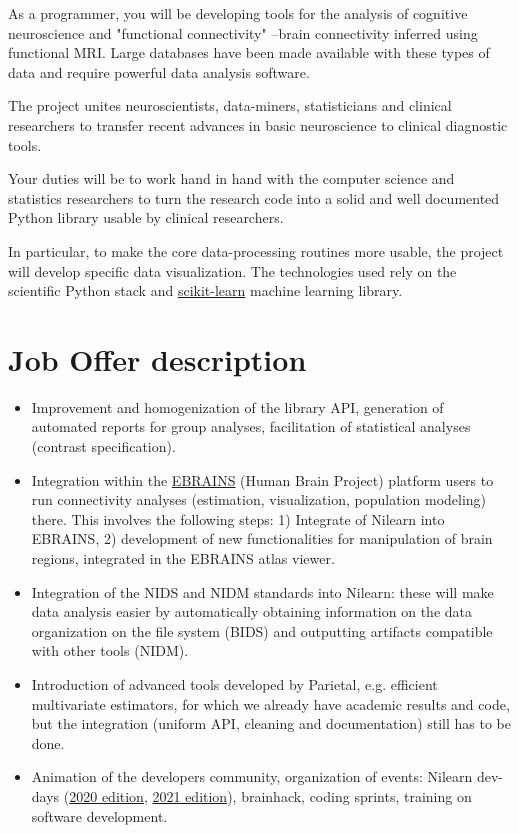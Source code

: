 \documentclass{article}
\begin{document}
As a programmer, you will be developing tools for the analysis of cognitive neuroscience and "functional connectivity" --brain connectivity inferred using functional MRI. Large databases have been made available with these types of data and require powerful data analysis software.

The project unites neuroscientists, data-miners, statisticians and clinical researchers to transfer recent advances in basic neuroscience to clinical diagnostic tools.

Your duties will be to work hand in hand with the computer science and statistics researchers to turn the research code into a solid and well documented Python library usable by clinical researchers.

In particular, to make the core data-processing routines more usable, the project will develop specific data visualization. The technologies used rely on the scientific Python stack and \href{https://scikit-learn.org/stable/}{scikit-learn} machine learning library.

\section*{Job Offer description}

\begin{itemize}
	\item Improvement and homogenization of the library API, generation of automated reports for group analyses, facilitation of statistical analyses (contrast specification).
	
	\item Integration within the \href{https://ebrains.eu}{EBRAINS} (Human Brain Project) platform users to run connectivity analyses (estimation, visualization, population modeling) there. This involves the following steps: 1) Integrate of Nilearn into EBRAINS, 2) development of new functionalities for manipulation of brain regions, integrated in the EBRAINS atlas viewer.
  
	\item Integration of the NIDS and NIDM standards into Nilearn: these will make data analysis easier by automatically obtaining information on the data organization on the file system (BIDS) and outputting artifacts compatible with other tools (NIDM).
	
	\item Introduction of advanced tools developed by Parietal, e.g. efficient multivariate estimators, for which we already have academic results and code, but the integration (uniform API, cleaning and documentation) still has to be done.
   
   \item Animation of the developers community, organization of events: Nilearn dev-days (\href{https://nilearn.github.io/dev-days-2020/}{2020 edition}, \href{https://nilearn.github.io/dev-days-2021/}{2021 edition}), brainhack, coding sprints, training on software development.
\end{itemize}
\end{document}
